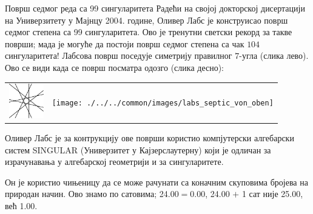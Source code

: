 \begin{surferPage}[99 сингуларитета]{Површ седмог реда са 99 сингуларитета}
    Радећи на својој докторској дисертацији на Универзитету у Мајнцу 2004. године, 
	Оливер Лабс је конструисао површ седмог степена са 99 сингуларитета. 
	Ово је тренутни светски рекорд за такве површи; мада је могуће да постоји површ 
	седмог степена са чак $104$ сингуларитета!  
    Лабсова површ поседује симетрију правилног $7$-угла (слика лево).
    Ово се види када се површ посматра одозго (слика десно):

    \vspace*{-0.3em}
    \begin{center}
      \begin{tabular}{c@{\qquad}c}
        \includegraphics[height=1.5cm]{./../../common/images/labsseptic1.pdf}
        &
        \texttt{[image: ./../../common/images/labs\_septic\_von\_oben]}
      \end{tabular}
    \end{center}
    \vspace*{-0.3em}

    Оливер Лабс је за контрукцију ове површи користио компјутерски алгебарски систем 
    SINGULAR (Универзитет у Кајзерслаутерну) који је одличан за израчунавања у 
	алгебарској геометрији и за сингуларитете.

    Он је користио чињеницу да се може рачунати са коначним скуповима бројева на 
    природан начин. Ово знамо по сатовима; 24.00$=$0.00, 24.00 $+$ 1 сат није
    25.00, већ 1.00.
\end{surferPage}
